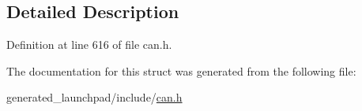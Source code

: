 \subsection{Detailed Description}


Definition at line 616 of file can.\+h.



The documentation for this struct was generated from the following file\+:\begin{DoxyCompactItemize}
\item 
generated\+\_\+launchpad/include/\mbox{\hyperlink{can_8h}{can.\+h}}\end{DoxyCompactItemize}
